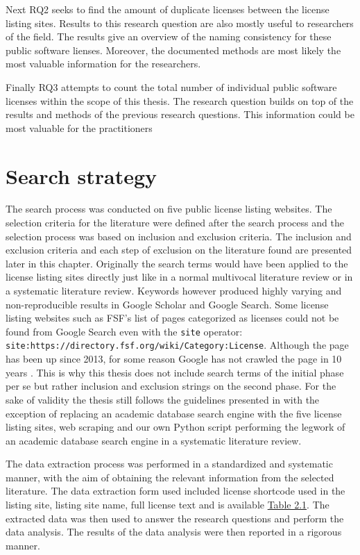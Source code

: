 Next RQ2 seeks to find the amount of duplicate licenses between the license listing sites. Results to this research question are also mostly useful to researchers of the field. The results give an overview of the naming consistency for these public software lienses. Moreover, the documented methods are most likely the most valuable information for the researchers.

Finally RQ3 attempts to count the total number of individual public software licenses within the scope of this thesis. The research question builds on top of the results and methods of the previous research questions. This information could be most valuable for the practitioners 

\section{Search strategy}
The search process was conducted on five public license listing websites. The selection criteria for the literature were defined after the search process and the selection process was based on inclusion and exclusion criteria. The inclusion and exclusion criteria and each step of exclusion on the literature found are presented later in this chapter. Originally the search terms would have been applied to the license listing sites directly just like in a normal multivocal literature review or in a systematic literature review. Keywords however produced highly varying and non-reproducible results in Google Scholar and Google Search. Some license listing websites such as FSF's list of pages categorized as licenses could not be found from Google Search even with the \texttt{site} operator: \\
\texttt{site:https://directory.fsf.org/wiki/Category:License}. Although the page has been up since 2013, for some reason Google has not crawled the page in 10 years \citep{fsf:licenselist}. This is why this thesis does not include search terms of the initial phase per se but rather inclusion and exclusion strings on the second phase. For the sake of validity the thesis still follows the guidelines presented in \cite{kitchenham2007} with the exception of replacing an academic database search engine with the five license listing sites, web scraping and our own Python script performing the legwork of an academic database search engine in a systematic literature review.

The data extraction process was performed in a standardized and systematic manner, with the aim of obtaining the relevant information from the selected literature. The data extraction form used included license shortcode used in the listing site, listing site name, full license text and is available  \hyperref[table:listing-sites]{Table 2.1}. The extracted data was then used to answer the research questions and perform the data analysis. The results of the data analysis were then reported in a rigorous manner.

